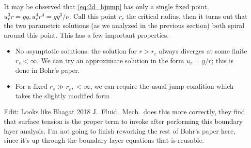 \documentclass[11pt,
        usenames, %
        dvipsnames %
    ]{report}
\begin{document}
It may be observed that \autoref{eq:2d_hjump} has only a single fixed point,
$u_r^3r = gq, u_r^4r^4 = gq^3/\nu$. Call this point $r_c$ the critical radius,
then it turns out that the two parametric solutions (as we analyzed in the
previous section) both spiral around this point. This has a few important
properties:
\begin{itemize}
    \item No asymptotic solutions: the solution for $r > r_c$ always diverges
        at some finite $r_s < \infty$. We can try an approximate solution in the
        form $u_r = y / r$; this is done in Bohr's paper.

    \item For a fixed $r_s \gg r_c, < \infty$, we can require the usual jump
        condition which takes the slightly modified form
\end{itemize}

Edit: Looks like Bhagat 2018 J.\ Fluid.\ Mech.\ does this more correctly, they
find that surface tension is the proper term to invoke after performing this
boundary layer analysis. I'm not going to finish reworking the rest of Bohr's
paper here, since it's up through the boundary layer equations that is reusable.
\end{document}
